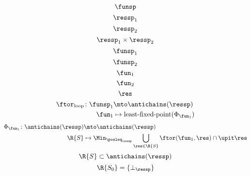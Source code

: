 {\begin{forslides}
\begin{equation*}
    \label{eq:genfun_2}
    \funsp
\end{equation*}
    \begin{equation*}
    \label{eq:genfun_3}
    \ressp_1
\end{equation*}
      \begin{equation*}
    \label{eq:genfun_3_1}
    \ressp_2
\end{equation*}
        \begin{equation*}
    \label{eq:genfun_3_2}
    \ressp_1\times \ressp_2
\end{equation*}
    \begin{equation*}
    \label{eq:genfun_4}
    \funsp_1
\end{equation*}
    \begin{equation*}
    \label{eq:genfun_5}
    \funsp_2
\end{equation*}
      \begin{equation*}
    \label{eq:genfun_6}
    \fun_1
\end{equation*}
        \begin{equation*}
    \label{eq:genfun_7}
    \fun_2
\end{equation*}
          \begin{equation*}
    \label{eq:genfun_8}
    \res
\end{equation*}
\begin{equation*}
    \label{eq:genfun_9}
    \begin{aligned}
      \ftor_\mathrm{loop}\colon \funsp_1 &\mto \antichains(\ressp)\\
      \fun_1&\mapsto \text{least-fixed-point}(\Phi_{\fun_1})
  \end{aligned}
\end{equation*}
  \begin{equation*}
    \label{eq:genfun_10}
    \begin{aligned}
      \Phi_{\fun_1}\colon \antichains(\ressp)&\mto \antichains(\ressp)\\
      \R{S}&\mapsto \Min_{\posleq_\ressp} \bigcup_{\res \in \R{S}}\ftor(\fun_1,\res)\cap \upit \res
  \end{aligned}
\end{equation*}
            \begin{equation*}
    \label{eq:genfun_11}
    \R{S}\subset \antichains(\ressp)
\end{equation*}
              \begin{equation*}
    \label{eq:genfun_12}
    \R{S_0}=\{ \bot_\ressp\}
\end{equation*}

\end{forslides}}
